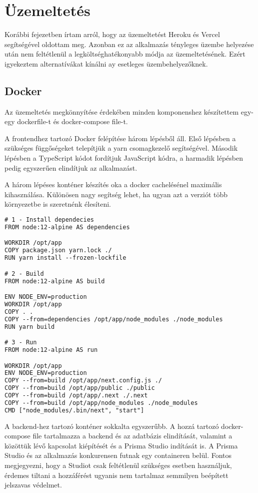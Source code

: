 \chapter{Üzemeltetés}
Korábbi fejezetben írtam arról, hogy az üzemeltetést Heroku és Vercel segítségével oldottam meg.
Azonban ez az alkalmazás tényleges üzembe helyezése után nem feltétlenül a legköltséghatékonyabb módja az üzemeltetésének.
Ezért igyekeztem alternatívákat kínálni ay esetleges üzembehelyezőknek.

\section{Docker}
Az üzemeltetés megkönnyítése érdekében minden komponenshez készítettem egy-egy dockerfile-t és docker-compose file-t.

A frontendhez tartozó Docker felépítése három lépésből áll. Első lépésben a szükséges függőségeket telepítjük a yarn csomagkezelő segítségével.
Második lépésben a TypeScript kódot fordítjuk JavaScript kódra, a harmadik lépésben pedig egyszerűen elindítjuk az alkalmazást.

A három lépéses konténer készítés oka a docker cachelésénel maximális kihasználása.
Különösen nagy segítség lehet, ha ugyan azt a verziót több környezetbe is szeretnénk élesíteni.

\begin{lstlisting}[language=TeX, caption=Frontend Dockerfile]
# 1 - Install dependecies
FROM node:12-alpine AS dependencies

WORKDIR /opt/app
COPY package.json yarn.lock ./
RUN yarn install --frozen-lockfile

# 2 - Build
FROM node:12-alpine AS build

ENV NODE_ENV=production
WORKDIR /opt/app
COPY . .
COPY --from=dependencies /opt/app/node_modules ./node_modules
RUN yarn build

# 3 - Run
FROM node:12-alpine AS run

WORKDIR /opt/app
ENV NODE_ENV=production
COPY --from=build /opt/app/next.config.js ./
COPY --from=build /opt/app/public ./public
COPY --from=build /opt/app/.next ./.next
COPY --from=build /opt/app/node_modules ./node_modules
CMD ["node_modules/.bin/next", "start"]
\end{lstlisting}

A backend-hez tartozó konténer sokkalta egyszerűbb. 
A hozzá tartozó docker-compose file tartalmazza a backend és az adatbázis elindítását, valamint a közöttük lévő kapcsolat kiépítését és a Prisma Studio indítását is.
A Prisma Studio és az alkalmazás konkurensen futnak egy containeren belül.
Fontos megjegyezni, hogy a Studiot csak feltétlenül szükséges esetben használjuk, érdemes tiltani a hozzáférést ugyanis nem tartalmaz semmilyen beépített jelszavas védelmet.

